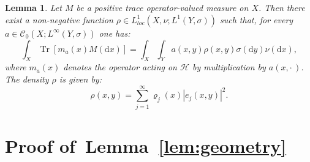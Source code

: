 \documentclass[10pt]{amsart}
\newtheorem{lemm}[cdrthm]{Lemma}
\theoremstyle{definition}
\DeclareMathOperator{\Trr}{Tr}
\newcommand*\loc{loc}
\newcommand*\Tr{\Trr}
\numberwithin{equation}{section}
\newcommand*{\dd}{\mathrm{d}}
\newcommand*{\dx}{\dd x}
\newcommand*{\dy}{\dd y}
\begin{document}
\begin{lemm}\label{lem:abs}
Let $M$ be a positive trace operator-valued measure on $X$. Then there exist a non-negative function $\rho\in L^1_{\loc}(X,\nu;L^1(Y,\sigma))$ such that, for every $a\in \mathcal{C}_0(X; L^\infty(Y,\sigma))$ one has:
\[
\int_X \Tr[m_a(x) M(\dx)] = \int_X \int_Y a(x,y) \rho(x,y)\sigma(\dy) \nu(\dx),
\]
where $m_a(x)$ denotes the operator acting on $\mathcal{H}$ by multiplication by $a(x,\cdot\,)$. The density $\rho$ is given by:
\[
\rho(x,y)=\sum_{j=1}^\infty \varrho_j(x)|e_j(x,y)|^2.
\]
\end{lemm}



\section{Proof of~Lemma~\ref{lem:geometry}}\label{sec:app_proof}
\end{document}
